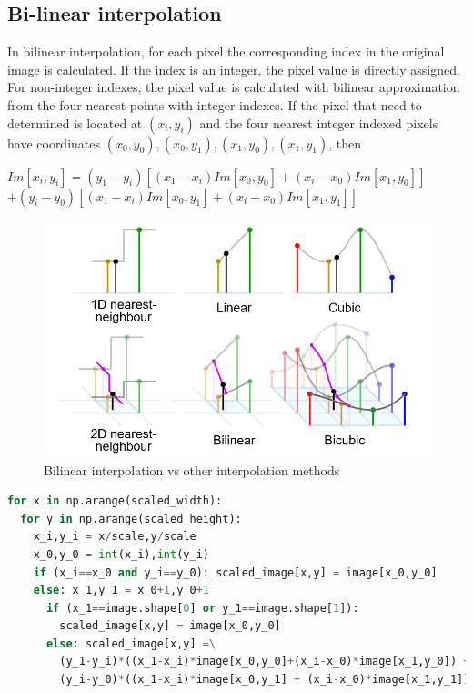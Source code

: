 \documentclass[11pt, a4paper]{article}
\begin{document}
\subsection{Bi-linear interpolation}
\begin{minipage}{.6\textwidth}
In bilinear interpolation, for each pixel the corresponding index in the original image is calculated. If the index is an integer, the pixel value is directly assigned. For non-integer indexes, the pixel value is calculated with bilinear approximation from the four nearest points with integer indexes. If the pixel that need to determined is located at $(x_{i},y_{i})$ and the four nearest integer indexed pixels have coordinates $(x_{0},y_{0}),(x_{0},y_{1}),(x_{1},y_{0}),(x_{1},y_{1})$, then
\begin{center}
$Im[x_{i},y_{i}] = (y_{1}-y_{i})[(x_{1}-x_{i})Im[x_{0},y_{0}] + (x_{i}-x_{0})Im[x_{1},y_{0}]]$\\$ + (y_{i}-y_{0})[(x_{1}-x_{i})Im[x_{0},y_{1}] + (x_{i}-x_{0})Im[x_{1},y_{1}]]$
\end{center}
\end{minipage}
\hfill
\begin{minipage}{.4\textwidth}
\begin{figure}[H]
	\centering
	\includegraphics[width=\textwidth]{Bilinear.png}
	\caption{Bilinear interpolation vs other interpolation methods \cite{Biwiki}}
	\label{fig:Bilinear}
\end{figure}
\end{minipage}
\begin{lstlisting}[language=python]
for x in np.arange(scaled_width):
  for y in np.arange(scaled_height):
    x_i,y_i = x/scale,y/scale
    x_0,y_0 = int(x_i),int(y_i)
    if (x_i==x_0 and y_i==y_0): scaled_image[x,y] = image[x_0,y_0]
    else: x_1,y_1 = x_0+1,y_0+1
      if (x_1==image.shape[0] or y_1==image.shape[1]):
        scaled_image[x,y] = image[x_0,y_0]
      else: scaled_image[x,y] =\
        (y_1-y_i)*((x_1-x_i)*image[x_0,y_0]+(x_i-x_0)*image[x_1,y_0]) +\
        (y_i-y_0)*((x_1-x_i)*image[x_0,y_1] + (x_i-x_0)*image[x_1,y_1])
\end{lstlisting}
\end{document}
